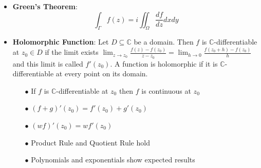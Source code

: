 \documentclass[12pt]{article}
\newcommand{\C}{\mathbb{C}}
\begin{document}
\begin{itemize}
    \item \textbf{Green's Theorem}:
    $$\int_\Gamma f(z)=i\iint_\Omega\frac{df}{dz}dxdy$$
    \item \textbf{Holomorphic Function}: Let $D\subseteq\C$ be a domain. Then $f$ is $\C$-differentiable at $z_0\in D$ if the limit exists $\lim_{z\rightarrow z_0}\frac{f(z)-f(z_0)}{z-z_0}=\lim_{h\rightarrow0}\frac{f(z_0+h)-f(z_0)}{h}$ and this limit is called $f'(z_0)$. A function is holomorphic if it is $\C$-differentiable at every point on its domain.
    \begin{itemize}
        \item[$\bullet$] If $f$ is $\C$-differentiable at $z_0$ then $f$ is continuous at $z_0$
        \item[$\bullet$] $(f+g)'(z_0)=f'(z_0)+g'(z_0)$
        \item[$\bullet$] $(wf)'(z_0)=wf'(z_0)$
        \item[$\bullet$] Product Rule and Quotient Rule hold
        \item[$\bullet$] Polynomials and exponentials show expected results
    \end{itemize}
\end{itemize}
\end{document}
